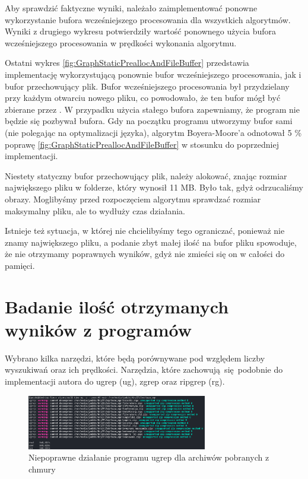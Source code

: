Aby sprawdzić faktyczne wyniki, należało zaimplementować ponowne wykorzystanie
bufora wcześniejszego procesowania dla wszystkich algorytmów. Wyniki z drugiego wykresu 
potwierdziły wartość ponownego użycia bufora wcześniejszego procesowania w prędkości wykonania
algorytmu.

Ostatni wykres \ref{fig:GraphStaticPreallocAndFileBuffer} przedstawia implementację
wykorzystującą ponownie bufor wcześniejszego procesowania, jak i bufor przechowujący plik.
Bufor wcześniejszego procesowania był przydzielany przy każdym otwarciu nowego pliku,
co powodowało, że ten bufor mógł być zbierane przez .
W przypadku użycia stałego bufora zapewniamy, że program nie będzie się pozbywał
bufora. Gdy na początku programu utworzymy bufor sami (nie polegając na optymalizacji języka),
algorytm Boyera-Moore'a odnotował 5 \% poprawę \ref{fig:GraphStaticPreallocAndFileBuffer}
w stosunku do poprzedniej implementacji.

Niestety statyczny bufor przechowujący plik, należy alokować, znając rozmiar 
największego pliku w folderze, który wynosił 11 MB. Było tak, gdyż odrzucaliśmy
obrazy. Moglibyśmy przed rozpoczęciem algorytmu sprawdzać rozmiar maksymalny 
pliku, ale to wydłuży czas działania. 

Istnieje też sytuacja, w której nie chcielibyśmy tego ograniczać, ponieważ nie
znamy największego pliku, a podanie zbyt małej ilość na bufor pliku spowoduje,
że nie otrzymamy poprawnych wyników, gdyż nie zmieści się on w całości do 
pamięci.

\section{Badanie ilość otrzymanych wyników z programów}

Wybrano kilka narzędzi, które będą porównywane pod względem liczby wyszukiwań
oraz ich prędkości. Narzędzia, które zachowują się podobnie do implementacji
autora do ugrep (ug), zgrep oraz ripgrep (rg). 

\begin{figure}[h]
\centering
\includegraphics[width=0.7\textwidth]{./images/ugrep-errors.png}
\caption{Niepoprawne działanie programu ugrep dla archiwów pobranych z chmury}
\label{fig:ugrepErrors}
\end{figure}

